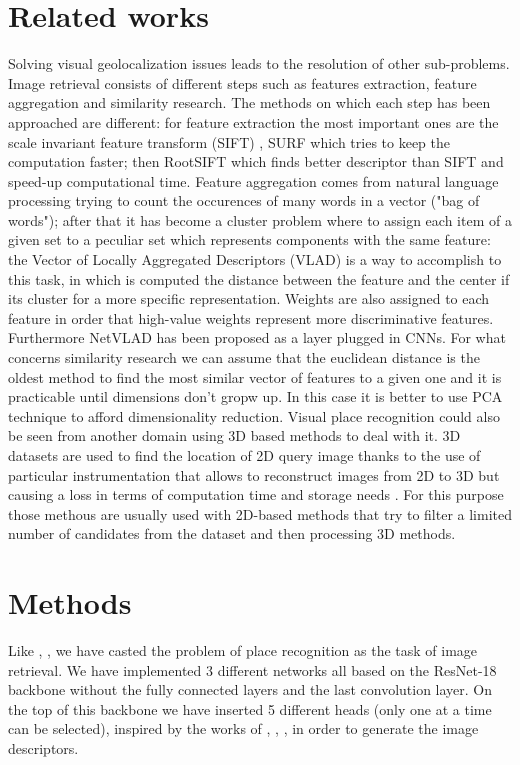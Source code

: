 \documentclass[10pt,twocolumn,letterpaper]{article}
\begin{document}
\section{Related works}
	Solving visual geolocalization issues leads to the resolution of other sub-problems.
	\newline Image retrieval consists of different steps such as features extraction, feature aggregation and similarity research.
	The methods on which each step has been approached are different: for feature extraction the most important ones are
	the scale invariant feature transform (SIFT) \cite{SIFT}, SURF \cite{SURF} which tries to keep the computation faster;
	then RootSIFT \cite{RootSIFT} which finds better descriptor than SIFT and speed-up computational time.
	\newline Feature aggregation comes from natural language processing trying to count the occurences of many words in a vector ("bag of words");
	after that it has become a cluster problem where to assign each item of a given set to a peculiar set which represents 
	components with the same feature: the Vector of Locally Aggregated Descriptors (VLAD) \cite{VLAD} is a way to accomplish to this task, in which
	is computed the distance between the feature and the center if its cluster for a more specific representation.
	Weights are also assigned to each feature in order that high-value weights represent more discriminative features.
	Furthermore NetVLAD \cite{NETVLAD} has been proposed as a layer plugged in CNNs.
	\newline For what concerns similarity research we can assume that the euclidean distance is the oldest method to find the most similar
	vector of features to a given one and it is practicable until dimensions don't gropw up. In this case it is better to use PCA technique
	to afford dimensionality reduction.
	\newline Visual place recognition could also be seen from another domain using 3D based methods to deal with it. 3D datasets are used to find
	the location of 2D query image thanks to the use of particular instrumentation that allows to reconstruct images from 2D to 3D but
	causing a loss in terms of computation time and storage needs \cite{3D}. For this purpose those methous are usually used with 2D-based methods
	that try to filter a limited number of candidates from the dataset and then processing 3D methods.

\section{Methods}
Like \cite{GEM}, \cite{NETVLAD}, \cite{CRN} we have casted the problem of place recognition as the task of image
retrieval. We have implemented 3 different networks all based on the ResNet-18 \cite{resnet} backbone
without the fully connected layers and the last convolution layer. On the top of this backbone we 
have inserted 5 different heads (only one at a time can be selected), inspired by the works of \cite{GEM}, \cite{NETVLAD}, \cite{CRN}, in order
to generate the image descriptors. 
\end{document}
